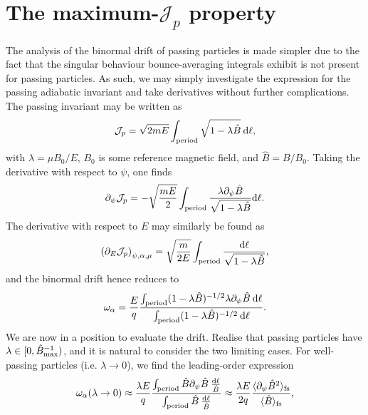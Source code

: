 \section{The maximum-$\mathcal{J}_p$ property}
The analysis of the binormal drift of passing particles is made simpler due to the fact that the singular behaviour bounce-averaging integrals exhibit is not present for passing particles. As such, we may simply investigate the expression for the passing adiabatic invariant and take derivatives without further complications. The passing invariant may be written as
\begin{equation}
    \mathcal{J}_p = \sqrt{2 m E }  \int_{\rm period} \sqrt{1 - \lambda \hat{B}} \: \mathrm{d} \ell,
\end{equation}
with $\lambda = \mu B_0/ E$, $B_0$ is some reference magnetic field, and $\hat{B} = B/B_0$. Taking the derivative with respect to $\psi$, one finds
\begin{equation}
    \partial_\psi \mathcal{J}_p = - \sqrt{\frac{m E}{2}} \int_{\rm period} \frac{\lambda \partial_\psi \hat{B}}{\sqrt{1 - \lambda \hat{B}}} \mathrm{d} \ell.
\end{equation}
The derivative with respect to $E$ may similarly be found as
\begin{equation}
    \left( \partial_E \mathcal{J}_p \right)_{\psi,\alpha,\mu} = \sqrt{\frac{m}{2E}} \int_{\rm period} \frac{\mathrm{d} \ell}{\sqrt{1 - \lambda \hat{B}}},
\end{equation}
and the binormal drift hence reduces to
\begin{equation}
    \omega_\alpha = \frac{E}{q} \frac{\int_{\rm period} (1 - \lambda \hat{B})^{-1/2} \lambda \partial_\psi \hat{B} \: \mathrm{d} \ell }{\int_{\rm period} (1 - \lambda \hat{B})^{-1/2} \: \mathrm{d} \ell}.
\end{equation}
We are now in a position to evaluate the drift. Realise that passing particles have $\lambda \in [0,\hat{B}_{\rm  max}^{-1})$, and it is natural to consider the two limiting cases. For well-passing particles (i.e. $\lambda \rightarrow 0$), we find the leading-order expression
\begin{equation}
    \omega_\alpha (\lambda \rightarrow 0) \approx \frac{\lambda E}{q} \frac{\int_{\rm period} \hat{B} \partial_\psi \hat{B} \: \frac{\mathrm{d} \ell}{\hat{B}} }{\int_{\rm period} \hat{B} \: \frac{\mathrm{d} \ell}{\hat{B}}} \approx \frac{\lambda E}{2q} \frac{\langle \partial_\psi \hat{B}^2 \rangle_{\rm fs}}{\langle\hat{B} \rangle_{\rm fs}},
\end{equation}
